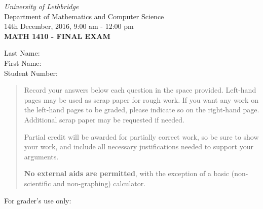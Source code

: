 \documentclass[12pt]{article}
\newcommand{\skipline}{\vspace{12pt}}
\begin{document}
\author{Instructor: Sean Fitzpatrick}
\thispagestyle{plain}
\begin{center}
\emph{University of Lethbridge}\\
Department of Mathematics and Computer Science\\
14th December, 2016, 9:00 am - 12:00 pm\\
{\bf MATH 1410 - FINAL EXAM}\\
\end{center}
\skipline \skipline \skipline \noindent \skipline
Last Name:\underline{\hspace{350pt}}\\
\skipline
First Name:\underline{\hspace{348pt}}\\
\skipline
Student Number:\underline{\hspace{322pt}}\\


\vspace{0.1in}


\begin{quote}

 
 Record your answers below each question in the space provided.    Left-hand pages may be used as scrap paper for rough work.  If you want any work on the left-hand pages to be graded, please indicate so on the right-hand page. Additional scrap paper may be requested if needed.
 
 \bigskip
 
 Partial credit will be awarded for partially correct work, so be sure to show your work, and include all necessary justifications needed to support your arguments. 

\bigskip

 \textbf{No external aids are permitted}, with the exception of a basic (non-scientific and non-graphing) calculator.
\end{quote}


\vspace{0.2in}

For grader's use only:
\end{document}
